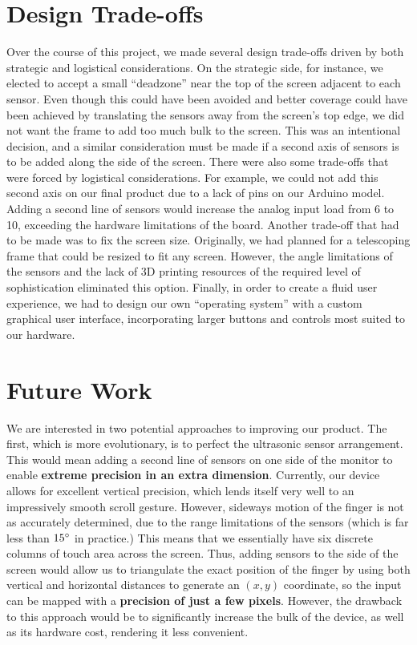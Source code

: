 \documentclass{article}
\begin{document}
\section{Design Trade-offs}
Over the course of this project, we made several design trade-offs driven by both strategic and logistical considerations. On the strategic side, for instance, we elected to accept a small “deadzone” near the top of the screen adjacent to each sensor. Even though this could have been avoided and better coverage could have been achieved by translating the sensors away from the screen’s top edge, we did not want the frame to add too much bulk to the screen. This was an intentional decision, and a similar consideration must be made if a second axis of sensors is to be added along the side of the screen. There were also some trade-offs that were forced by logistical considerations. For example, we could not add this second axis on our final product due to a lack of pins on our Arduino model. Adding a second line of sensors would increase the analog input load from 6 to 10, exceeding the hardware limitations of the board. Another trade-off that had to be made was to fix the screen size. Originally, we had planned for a telescoping frame that could be resized to fit any screen. However, the angle limitations of the sensors and the lack of 3D printing resources of the required level of sophistication eliminated this option. Finally, in order to create a fluid user experience, we had to design our own “operating system” with a custom graphical user interface, incorporating larger buttons and controls most suited to our hardware.

\section{Future Work}
We are interested in two potential approaches to improving our product. The first, which is more evolutionary, is to perfect the ultrasonic sensor arrangement. This would mean adding a second line of sensors on one side of the monitor to enable \textbf{extreme precision in an extra dimension}. Currently, our device allows for excellent vertical precision, which lends itself very well to an impressively smooth scroll gesture. However, sideways motion of the finger is not as accurately determined, due to the range limitations of the sensors (which is far less than $15\degree$ in practice.) This means that we essentially have six discrete columns of touch area across the screen. Thus, adding sensors to the side of the screen would allow us to triangulate the exact position of the finger by using both vertical and horizontal distances to generate an $(x,y)$ coordinate, so the input can be mapped with a \textbf{precision of just a few pixels}. However, the drawback to this approach would be to significantly increase the bulk of the device, as well as its hardware cost, rendering it less convenient.
\end{document}

